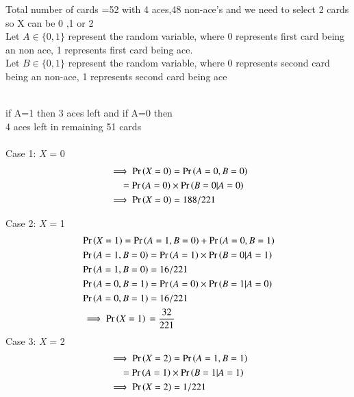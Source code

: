 Total number of cards =52 with 4 aces,48 non-ace's and we need to select 2 cards
so X can be 0 ,1 or 2\\ 

Let $A \in \{0,1\}$ represent the random variable, where 0 represents first card being an non ace, 1 represents first card being ace. \\
Let $B \in \{0,1\}$ represent the random variable, where 0 represents second card being an non-ace, 1 represents second card being ace 
\begin{table}[ht]
\caption{Probability for random variables}
\centering
{}
\label{5.9:Tab:Tcr}
\end{table}\\
if A=1 then 3 aces left and if A=0 then\\ 4 aces left in remaining 51 cards\\ \\ 
Case 1: \emph{X} = 0
\begin{align}
\nonumber
&\implies \Pr\left(X=0\right)=\Pr\left(A=0,B=0\right)\\ \nonumber
&\quad\,\, =\Pr\left(A=0\right)\times \Pr\left(B=0|A=0\right)\\ \nonumber
&\implies\Pr\left(X=0\right) =188/221\\
\end{align}

Case 2: \emph{X} = 1
\begin{align}
\nonumber
&\Pr\left(X=1\right)=\Pr\left(A=1,B=0\right)+\Pr\left(A=0,B=1\right)\\ \nonumber 
&\Pr\left(A=1,B=0\right)=\Pr\left(A=1\right)\times \Pr\left(B=0|A=1\right)\\ \nonumber
&\Pr\left(A=1,B=0\right)=16/221\\ \nonumber
&\Pr\left(A=0,B=1\right)=\Pr\left(A=0\right)\times \Pr\left(B=1|A=0\right)\\ \nonumber
&\Pr\left(A=0,B=1\right) =16/221\\ \nonumber
&\implies\Pr\left(X=1\right)\,=\frac{32}{221}\\
\end{align}
Case 3: \emph{X} = 2
\begin{align}
\nonumber
&\implies \Pr\left(X=2\right)=\Pr\left(A=1,B=1\right)\\ \nonumber
&\quad\,\, =\Pr\left(A=1\right)\times\Pr\left(B=1|A=1\right)\\ \nonumber
&\implies \Pr\left(X=2\right)=1/221\\
\end{align}

